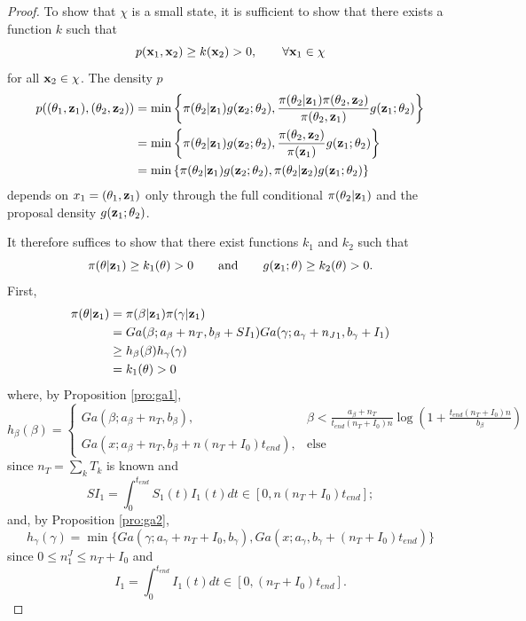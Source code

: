 \documentclass[11pt]{article}
\begin{document}
\begin{proof}
		To show that $\chi$ is a small state, it is sufficient to show that there exists a function $k$ such that
		$$p(\mathbf{x}_1, \mathbf{x}_2) \ge k(\mathbf{x}_2) > 0, \qquad \forall \mathbf{x}_1 \in \chi $$
		for all $\mathbf{x}_2 \in \chi$.
		The density $p$ 
		\begin{align*}
			p((\theta_1, \mathbf{z}_1), (\theta_2, \mathbf{z}_2))
			& = \min\left\lbrace \pi(\theta_2| \mathbf{z}_1)g(\mathbf{z}_2; \theta_2), \dfrac{\pi(\theta_2| \mathbf{z}_1) \pi(\theta_2, \mathbf{z}_2)}{\pi(\theta_2, \mathbf{z}_1)} g(\mathbf{z}_1; \theta_2) \right\rbrace \\
			& = \min\left\lbrace \pi(\theta_2| \mathbf{z}_1)g(\mathbf{z}_2; \theta_2), \dfrac{\pi(\theta_2, \mathbf{z}_2)}{\pi(\mathbf{z}_1)} g(\mathbf{z}_1; \theta_2) \right\rbrace \\
			& = \min\left\lbrace \pi(\theta_2| \mathbf{z}_1)g(\mathbf{z}_2; \theta_2),
			\pi(\theta_2| \mathbf{z}_2)
			g(\mathbf{z}_1; \theta_2)\right\rbrace
		\end{align*}
		depends on $x_1 = (\theta_1, \mathbf{z}_1)$ only through the full conditional $\pi(\theta_2| \mathbf{z}_1)$ and the proposal density $g(\mathbf{z}_1; \theta_2)$.
		
		It therefore suffices to show that there exist functions $k_1$ and $k_2$ such that
		$$\pi(\theta| \mathbf{z}_1) \ge k_1(\theta) > 0 \qquad \text{and} \qquad  g(\mathbf{z}_1; \theta) \ge k_2(\theta) > 0.$$
		First, 
		\begin{align*}
			\pi(\theta| \mathbf{z}_1) 
			& = \pi(\beta| \mathbf{z}_1) \pi(\gamma| \mathbf{z}_1)  \\
			& = Ga(\beta; a_{\beta} + n_T, b_{\beta} + SI_1) Ga(\gamma; a_{\gamma} + {n_J}_1, b_{\gamma} + I_1) \\
			& \ge h_{\beta}(\beta) h_{\gamma}(\gamma) \\
			& = k_1(\theta) > 0
		\end{align*}
		where, by Proposition \ref{pro:ga1},
		$$h_{\beta}(\beta) = \begin{cases}
			Ga(\beta;a_{\beta}+n_T,b_{\beta}), & \beta<\frac{a_{\beta}+n_T}{t_{end}(n_T+I_0) n} \log \left( 1 + \frac{t_{end}(n_T+I_0) n}{b_{\beta}}\right) \\ Ga(x;a_{\beta}+n_T,b_{\beta}+n(n_T+I_0) t_{end}), & \text{else}
		\end{cases}$$
		since $n_T = \sum_k T_k$ is known and 
		$$SI_1 = \int_{0}^{t_{end}}S_1(t)I_1(t)dt \in [0, n (n_T+I_0) t_{end}];$$
		and, by Proposition \ref{pro:ga2},
		$$h_{\gamma}(\gamma) = \min\{
		Ga(\gamma;a_{\gamma}+n_T+I_0,b_{\gamma}), Ga(x;a_{\gamma},b_{\gamma}+(n_T+I_0) t_{end})\}
		$$
		since $0\le n_1^J \le n_T + I_0$ and
		$$I_1 = \int_{0}^{t_{end}}I_1(t)dt \in [0, (n_T+I_0) t_{end}].$$
		

\end{proof}
\end{document}
